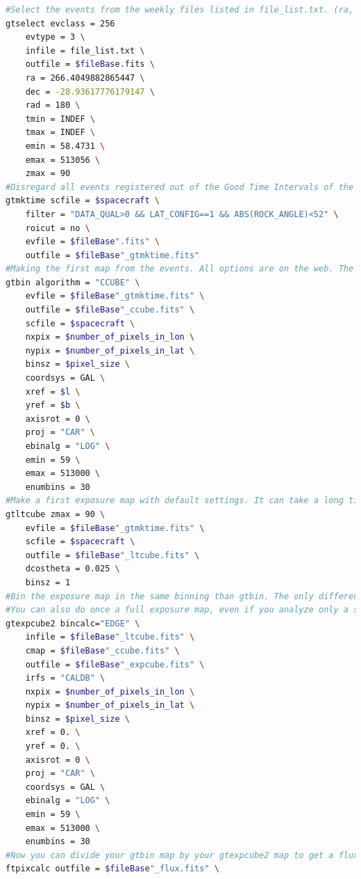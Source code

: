 \begin{lstlisting}[language=bash,caption={Bash script details for the treatment of the Fermi LAT data.},label={app:script}, breaklines=true]
#Select the events from the weekly files listed in file_list.txt. (ra, dec) is the galactic center coordinates in ICRS system, a radius of 180 to select the whole sky, and the energy bounds. The one here correspond to the energy bound of the Fermi diffuse model. You might run into troubles later if you try to use it with energies out of this range
gtselect evclass = 256 
	evtype = 3 \
	infile = file_list.txt \
	outfile = $fileBase.fits \
	ra = 266.4049882865447 \
	dec = -28.93617776179147 \
	rad = 180 \
	tmin = INDEF \
	tmax = INDEF \
	emin = 58.4731 \
	emax = 513056 \
	zmax = 90
#Disregard all events registered out of the Good Time Intervals of the spacecraft, with the cut recommended by Fermi peoples
gtmktime scfile = $spacecraft \
	filter = "DATA_QUAL>0 && LAT_CONFIG==1 && ABS(ROCK_ANGLE)<52" \
	roicut = no \
	evfile = $fileBase".fits" \
	outfile = $fileBase"_gtmktime.fits"
#Making the first map from the events. All options are on the web. The settings of this map are reused later for the exposure for example.
gtbin algorithm = "CCUBE" \
	evfile = $fileBase"_gtmktime.fits" \
	outfile = $fileBase"_ccube.fits" \
	scfile = $spacecraft \
	nxpix = $number_of_pixels_in_lon \
	nypix = $number_of_pixels_in_lat \
	binsz = $pixel_size \
	coordsys = GAL \
	xref = $l \
	yref = $b \
	axisrot = 0 \
	proj = "CAR" \
	ebinalg = "LOG" \
	emin = 59 \
	emax = 513000 \
	enumbins = 30
#Make a first exposure map with default settings. It can take a long time. Here the zmax=90 is to avoid the earth limbs contamination.
gtltcube zmax = 90 \
	evfile = $fileBase"_gtmktime.fits" \
	scfile = $spacecraft \
	outfile = $fileBase"_ltcube.fits" \
	dcostheta = 0.025 \
	binsz = 1
#Bin the exposure map in the same binning than gtbin. The only difference is for the energy bins: It creates a map for every energy bin's "EDGE" when gtbin creates a map for every energy bin's "CENTER". This can be changed via "bincalc" option but you need to let it on edge for later.
#You can also do once a full exposure map, even if you analyze only a small sky region, if you don't change the cuts in gtselect you can then reuse it.
gtexpcube2 bincalc="EDGE" \
	infile = $fileBase"_ltcube.fits" \
	cmap = $fileBase"_ccube.fits" \
	outfile = $fileBase"_expcube.fits" \
	irfs = "CALDB" \
	nxpix = $number_of_pixels_in_lon \
	nypix = $number_of_pixels_in_lat \
	binsz = $pixel_size \
	xref = 0. \
	yref = 0. \
	axisrot = 0 \
	proj = "CAR" \
	coordsys = GAL \
	ebinalg = "LOG" \
	emin = 59 \
	emax = 513000 \
	enumbins = 30
#Now you can divide your gtbin map by your gtexpcube2 map to get a flux map! Use this:
ftpixcalc outfile = $fileBase"_flux.fits" \

\end{lstlisting}
